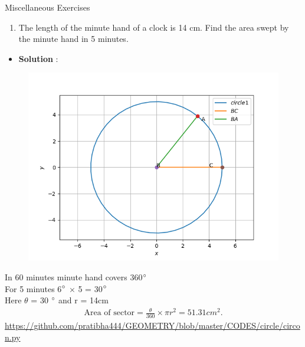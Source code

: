 \begin{frame}{Miscellaneous Exercises}
\begin{enumerate}
\conti
\item The length of the
minute hand of a clock is 14 cm. Find the area
swept by the minute hand in 5 minutes.\\
\seti
\end{enumerate}
\begin{itemize}
\item \textbf{Solution} :
\begin{figure}[!ht]
\resizebox{0.2\linewidth}{!}
{

}
\end{figure}


\end{itemize}
\end{frame}
\begin{frame}
\begin{figure}
\includegraphics[scale=.6]{./CODES/misc.png}
\end{figure}
\end{frame}
\begin{frame}

 In 60 minutes minute hand covers  360$\degree$\\
For 5 minutes 6$\degree$ $\times$ 5 = 30$\degree$\\ 
Here $\theta$ = 30 $\degree$ and r = 14cm\\

\begin{align*}
	\text{Area of sector} = \frac{\theta}{360} \times \pi r^2
	=51.31cm^2.
\end{align*}   
\url{https://github.com/pratibha444/GEOMETRY/blob/master/CODES/circle/circon.py}            
\end{frame}